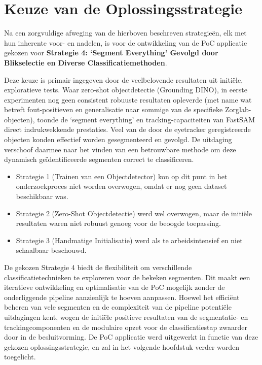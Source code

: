\section{Keuze van de Oplossingsstrategie}

Na een zorgvuldige afweging van de hierboven beschreven strategieën, elk met hun inherente voor- en nadelen, is voor de ontwikkeling van de PoC 
applicatie gekozen voor \textbf{Strategie 4: `Segment Everything' Gevolgd door Blikselectie en Diverse Classificatiemethoden}.

Deze keuze is primair ingegeven door de veelbelovende resultaten uit initiële, exploratieve tests. 
Waar zero-shot objectdetectie (Grounding DINO), in eerste experimenten nog geen consistent robuuste resultaten opleverde
(met name wat betreft fout-positieven en generalisatie naar sommige van de specifieke Zorglab-objecten), 
toonde de `segment everything' en tracking-capaciteiten van FastSAM direct indrukwekkende prestaties.
Veel van de door de eyetracker geregistreerde objecten konden effectief worden gesegmenteerd en gevolgd. 
De uitdaging verschoof daarmee naar het vinden van een betrouwbare methode om deze dynamisch geïdentificeerde segmenten correct te classificeren.

\begin{itemize}
    \item Strategie 1 (Trainen van een Objectdetector) kon op dit punt in het onderzoekproces niet worden overwogen, omdat er nog geen dataset beschikbaar was.
    \item Strategie 2 (Zero-Shot Objectdetectie) werd wel overwogen, maar de initiële resultaten waren niet robuust genoeg voor de beoogde toepassing.
    \item Strategie 3 (Handmatige Initialisatie) werd als te arbeidsintensief en niet schaalbaar beschouwd.
\end{itemize}

De gekozen Strategie 4 biedt de flexibiliteit om verschillende classificatietechnieken te exploreren voor de bekeken segmenten.
Dit maakt een iteratieve ontwikkeling en optimalisatie van de PoC mogelijk zonder de onderliggende pipeline aanzienlijk te hoeven aanpassen.
Hoewel het efficiënt beheren van vele segmenten en de complexiteit van de pipeline potentiële uitdagingen kent, 
wogen de initiële positieve resultaten van de segmentatie- en trackingcomponenten en de modulaire opzet voor de classificatiestap zwaarder door in de besluitvorming.
De PoC applicatie werd uitgewerkt in functie van deze gekozen oplossingsstrategie, en zal in het volgende hoofdstuk verder worden toegelicht.